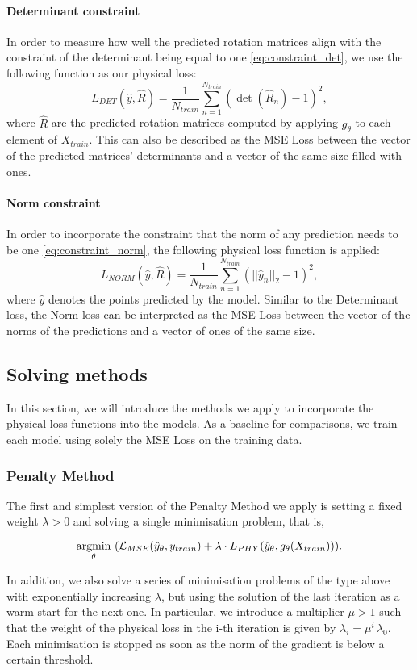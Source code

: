\paragraph{Determinant constraint} 
In order to measure how well the predicted rotation matrices align with the constraint of the determinant being equal to one \eqref{eq:constraint_det}, we use the following function as our physical loss:
\[L_{DET}(\hat{y}, \hat{R}) = \frac{1}{N_{train}}\sum_{n = 1}^{N_{train}}(\det(\hat{R}_n) - 1)^2,\]
where $\hat{R}$ are the predicted rotation matrices computed by applying $g_\theta$ to each element of $X_{train}$. This can also be described as the MSE Loss between the vector of the predicted matrices' determinants and a vector of the same size filled with ones.
\paragraph{Norm constraint} 
In order to incorporate the constraint that the norm of any prediction needs to be one \eqref{eq:constraint_norm}, the following physical loss function is applied:
\[L_{NORM}(\hat{y}, \hat{R}) = \frac{1}{N_{train}}\sum_{n = 1}^{N_{train}}(||\hat{y}_n||_2 - 1)^2, \]
where $\hat{y}$ denotes the points predicted by the model. Similar to the Determinant loss, the Norm loss can be interpreted as the MSE Loss between the vector of the norms of the predictions and a vector of ones of the same size.

\subsection{Solving methods}
In this section, we will introduce the methods we apply to incorporate the physical loss functions into the models. As a baseline for comparisons, we train each model using solely the MSE Loss on the training data.

\subsubsection{Penalty Method}
The first and simplest version of the Penalty Method we apply is setting a fixed weight $\lambda > 0$ and solving a single minimisation problem, that is,

\[\underset{\theta}{\operatorname*{argmin}} \,\, (\mathcal{L}_{MSE}(\hat{y}_\theta, y_{train}) + \lambda \cdot L_{PHY}(\hat{y}_\theta, g_\theta(X_{train}))).\]

In addition, we also solve a series of minimisation problems of the type above with exponentially increasing $\lambda$, but using the solution of the last iteration as a warm start for the next one. In particular, we introduce a multiplier $\mu > 1$ such that the weight of the physical loss in the i-th iteration is given by $\lambda_i = \mu^i \, \lambda_0$. Each minimisation is stopped as soon as the norm of the gradient is below a certain threshold.

